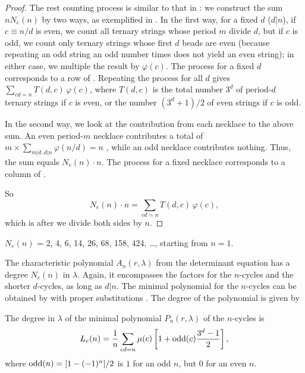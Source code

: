 \documentclass{ws-ijbc}
\begin{document}
\begin{proof}
The rest counting process is similar to that in :
%
we construct the sum $n N_e(n)$ by two ways, as exemplified in .
%
In the first way,
  for a fixed $d$ ($d|n$),
  if $c\equiv n/d$ is even,
    we count all ternary strings whose period $m$ divide $d$,
  but if $c$ is odd, we count only ternary strings
    whose first $d$ beads are even
    (because repeating an odd string an odd number times
    does not yield an even string);
  in either case, we multiple the result by $\varphi(c)$.
%
The process for a fixed $d$ corresponds to a row of .
%
Repeating the process for all $d$ gives
  $\sum_{cd = n} T(d, c) \, \varphi(c)$,
  where $T(d, c)$ is the total number $3^d$ of period-$d$ ternary strings if $c$ is even,
  or the number $(3^d+1)/2$ of even strings if $c$ is odd.


In the second way,
  we look at the contribution from each necklace to the above sum.
An even period-$m$ necklace contributes a total of
  $m \times \sum_{m|d, d|n} \varphi(n/d) = n$
  ,
  while an odd necklace contributes nothing.
Thus, the sum equals $N_e(n)\cdot n$.
%
The process for a fixed necklace corresponds to
  a column of .


So
\[
  N_e(n) \cdot n = \sum_{cd = n} T(d, c) \, \varphi(c),
\]
which is 
after we divide both sides by $n$.
\end{proof}

%
$N_e(n)$ = 2, 4, 6, 14, 26, 68, 158, 424, \dots, starting from $n = 1$.
%



The characteristic polynomial $A_n(r, \lambda)$
  from the determinant equation
  has a degree $N_e(n)$ in $\lambda$.
Again, it encompasses the factors for the $n$-cycles
  and the shorter $d$-cycles, as long as $d|n$.
The minimal polynomial for the $n$-cycles can be obtained
  by  with proper substitutions
  .
The degree of the polynomial is given by


\begin{theorem}
The degree in $\lambda$ of
the minimal polynomial $P_n(r, \lambda)$ of the $n$-cycles is
\begin{equation}
  L_e(n) = \frac{1}{n} \sum_{cd = n} \mu(c)
    \left[
      1 + \mathrm{odd}(c)\frac{3^d-1}{2}
    \right],
\label{eq:cublyndon}
\end{equation}
where $\mathrm{odd}(n) = [1 - (-1)^n]/2$
is $1$ for an odd $n$,
but $0$ for an even $n$.
\label{thm:cublyndon}
\end{theorem}
\end{document}

